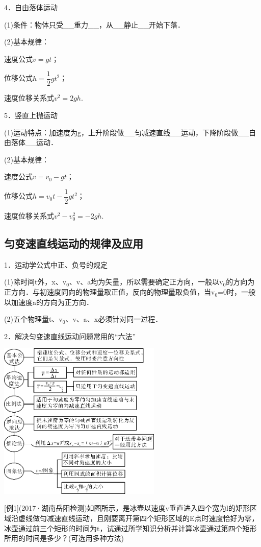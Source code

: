 4．自由落体运动

(1)条件：物体只受\_\_重力\_\_，从\_\_静止\_\_开始下落．

(2)基本规律：

速度公式$v=g t$；

位移公式$h=\dfrac{1}{2} g t^{2}$；

速度位移关系式$v^{2}=2 g h$.

5．竖直上抛运动

(1)运动特点：加速度为g，上升阶段做\_\_匀减速直线\_\_运动，下降阶段做\_\_自由落体\_\_运动．

(2)基本规律：

速度公式$v=v_{0}-g t$；

位移公式$h=v_{0} t-\dfrac{1}{2} g t^{2}$；

速度位移关系式$v^{2}-v_{0}^{2}=-2 g h$.
\newpage
\subsection{匀变速直线运动的规律及应用}

1．运动学公式中正、负号的规定

(1)除时间t外，x、$\mathrm v_0$、v、a均为矢量，所以需要确定正方向，一般以$\mathrm v_0$的方向为正方向．与初速度同向的物理量取正值，反向的物理量取负值，当$\mathrm v_0$=0时，一般以加速度a的方向为正方向．

(2)五个物理量t、$\mathrm v_0$、v、a、x必须针对同一过程．

2．解决匀变速直线运动问题常用的``六法''

\begin{center}\includegraphics[width=3.06458in,height=2.96319in]{media/image23.png}\end{center}

{[}例1{]}(2017·湖南岳阳检测)如图所示，是冰壶以速度v垂直进入四个宽为l的矩形区域沿虚线做匀减速直线运动，且刚要离开第四个矩形区域的E点时速度恰好为零，冰壶通过前三个矩形的时间为t，试通过所学知识分析并计算冰壶通过第四个矩形所用的时间是多少？(可选用多种方法)

